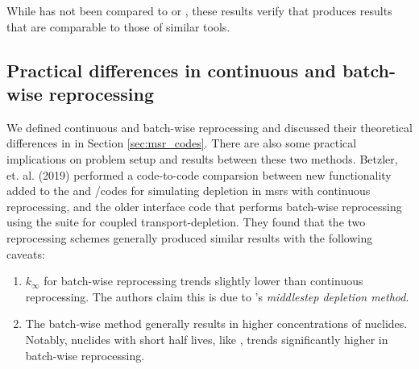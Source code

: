 While \SaltProc has not been compared to \SCALE or \ADDER, these results verify
that \SaltProc produces results that are comparable to those of similar tools.


\subsection{Practical differences in continuous and batch-wise reprocessing}
We defined continuous and batch-wise reprocessing and discussed their
theoretical differences in in Section \ref{sec:msr_codes}. There are also some
practical implications on problem setup and results between these two methods.
Betzler, et. al. (2019) \cite{betzler_molten_2019} performed a code-to-code
comparsion between new functionality added to the \ORIGEN and \SCALE/\TRITON codes
for simulating depletion in \Gls{msr}s with continuous reprocessing, and the
older \ChemTriton \cite{betzler_molten_2017} interface code that performs
batch-wise reprocessing using the \SCALE suite for coupled transport-depletion.
They found that the two reprocessing schemes generally produced similar results
with the following caveats:
\begin{enumerate}
    \item $k_{\infty}$ for batch-wise reprocessing trends slightly lower than  continuous reprocessing. The authors claim this is due to \SCALE's {\it middlestep depletion method}. 
    \item The batch-wise method generally results in higher concentrations of nuclides. Notably, nuclides with short half lives, like , trends significantly higher in batch-wise reprocessing.
\end{enumerate}


